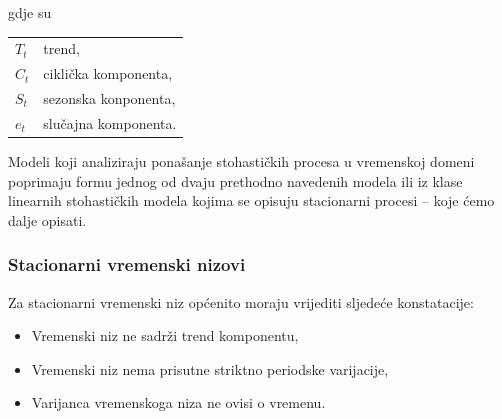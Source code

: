 \documentclass[a4paper,12pt,oneside]{memoir}
\begin{document}
                gdje su

                \begin{table}[H]
                    \centering
                    \begin{tabular*}{0.9\textwidth}{l p{13cm}}
                        \textit{$T_t$} & trend\footnotemark ,\\
                        \textit{$C_t$} & ciklička komponenta\footnotemark ,\\
                        \textit{$S_t$} & sezonska konponenta\footnotemark ,\\
                        \textit{$e_t$} & slučajna komponenta\footnotemark .
                    \end{tabular*}
                \end{table}

                
                Modeli koji analiziraju ponašanje stohastičkih procesa u vremenskoj domeni poprimaju formu jednog od dvaju prethodno navedenih modela ili iz klase linearnih stohastičkih modela kojima se opisuju stacionarni procesi -- koje ćemo dalje opisati.

                \subsubsection{Stacionarni vremenski nizovi}

                    Za stacionarni vremenski niz općenito moraju vrijediti sljedeće konstatacije:

                    \begin{itemize}
                        \item Vremenski niz ne sadrži trend komponentu,
                        \item Vremenski niz nema prisutne striktno periodske varijacije,
                        \item Varijanca vremenskoga niza ne ovisi o vremenu.
                    \end{itemize}
\end{document}
